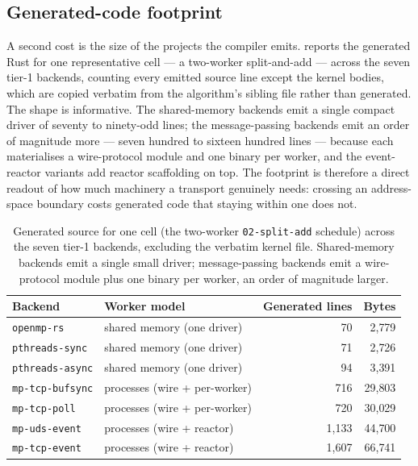 \subsection{Generated-code footprint}\label{sec:res-quant-gen}

A second cost is the size of the projects the compiler emits.
 reports the generated Rust for one representative cell --- a
two-worker split-and-add --- across the seven tier-1 backends, counting every emitted
source line except the kernel bodies, which are copied verbatim from the algorithm's
sibling file rather than generated. The shape is informative. The shared-memory
backends emit a single compact driver of seventy to ninety-odd lines; the
message-passing backends emit an order of magnitude more --- seven hundred to sixteen
hundred lines --- because each materialises a wire-protocol module and one binary per
worker, and the event-reactor variants add reactor scaffolding on top. The footprint
is therefore a direct readout of how much machinery a transport genuinely needs:
crossing an address-space boundary costs generated code that staying within one does
not.

\begin{table}[t]
  \centering
  \small
  \begin{tabular}{@{}llrr@{}}
    \toprule
    Backend & Worker model & Generated lines & Bytes \\
    \midrule
    \texttt{openmp-rs}      & shared memory (one driver)   & 70   & 2{,}779 \\
    \texttt{pthreads-sync}  & shared memory (one driver)   & 71   & 2{,}726 \\
    \texttt{pthreads-async} & shared memory (one driver)   & 94   & 3{,}391 \\
    \texttt{mp-tcp-bufsync} & processes (wire + per-worker) & 716  & 29{,}803 \\
    \texttt{mp-tcp-poll}    & processes (wire + per-worker) & 720  & 30{,}029 \\
    \texttt{mp-uds-event}   & processes (wire + reactor)    & 1{,}133 & 44{,}700 \\
    \texttt{mp-tcp-event}   & processes (wire + reactor)    & 1{,}607 & 66{,}741 \\
    \bottomrule
  \end{tabular}
  \caption{Generated source for one cell (the two-worker \texttt{02-split-add}
  schedule) across the seven tier-1 backends, excluding the verbatim kernel file.
  Shared-memory backends emit a single small driver; message-passing backends emit a
  wire-protocol module plus one binary per worker, an order of magnitude larger.}
  \label{tab:quant-gen}
\end{table}

